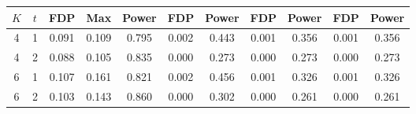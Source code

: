 \begin{table}[!htbp]
\begin{tabular}{ccccc cc cc cc}
\cmidrule(lr){3-5}\cmidrule(lr){6-7}\cmidrule(lr){8-9}\cmidrule(lr){10-11}
$K$ & $t$ & FDP & Max & Power & FDP & Power & FDP & Power & FDP & Power\\
\midrule
4 & 1 & 0.091 & 0.109 & 0.795 & 0.002 & 0.443 & 0.001 & 0.356 & 0.001 & 0.356\\
4 & 2 & 0.088 & 0.105 & 0.835 & 0.000 & 0.273 & 0.000 & 0.273 & 0.000 & 0.273\\
6 & 1 & 0.107 & 0.161 & 0.821 & 0.002 & 0.456 & 0.001 & 0.326 & 0.001 & 0.326\\
6 & 2 & 0.103 & 0.143 & 0.860 & 0.000 & 0.302 & 0.000 & 0.261 & 0.000 & 0.261\\
\bottomrule
\end{tabular}
\end{table}
